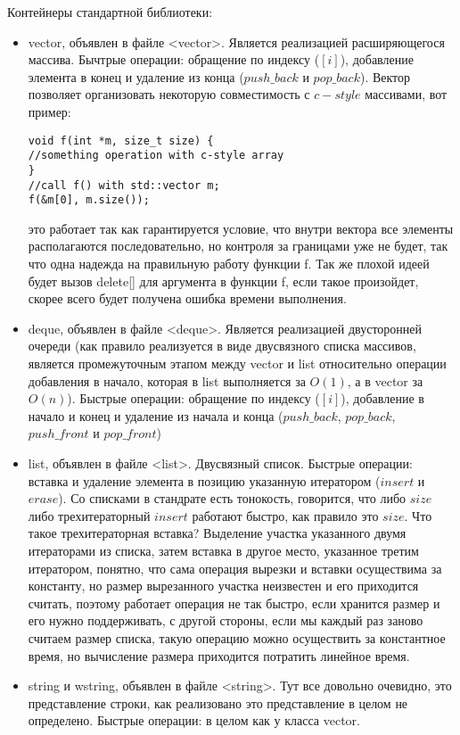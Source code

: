 Контейнеры стандартной библиотеки:

\begin{itemize}
\item vector, объявлен в файле <vector>. Является реализацией расширяющегося массива. Бычтрые операции: обращение по индексу ($[i]$), добавление элемента в конец и
удаление из конца ($push\_back$ и $pop\_back$). Вектор позволяет организовать некоторую совместимость с $c-style$ массивами, вот пример:
\begin{lstlisting}
void f(int *m, size_t size) {
//something operation with c-style array
}
//call f() with std::vector m;
f(&m[0], m.size());
\end{lstlisting}
это работает так как гарантируется условие, что внутри вектора все элементы располагаются последовательно, но контроля за границами уже не будет, так что
одна надежда на правильную работу функции f. Так же плохой идеей будет вызов delete[] для аргумента в функции f, если такое произойдет, скорее всего будет получена
ошибка времени выполнения.

\item deque, объявлен в файле <deque>. Является реализацией двусторонней очереди (как правило реализуется в виде двусвязного списка массивов, является промежуточным
этапом между vector и list относительно операции добавления в начало, которая в list выполняется за $O\left(1\right)$, а в vector за $O\left(n\right)$). Быстрые
операции: обращение по индексу ($[i]$), добавление в начало и конец и удаление из начала и конца ($push\_back$, $pop\_back$, $push\_front$ и $pop\_front$)

\item list, объявлен в файле <list>. Двусвязный список. Быстрые операции: вставка и удаление элемента в позицию указанную итератором ($insert$ и $erase$). Со списками
в стандрате есть тонокость, говорится, что либо $size$ либо трехитераторный $insert$ работают быстро, как правило это $size$. Что такое трехитераторная вставка?
Выделение участка указанного двумя итераторами из списка, затем вставка в другое место, указанное третим итератором, понятно, что сама операция вырезки и вставки
осуществима за константу, но размер вырезанного участка неизвестен и его приходится считать, поэтому работает операция не так быстро, если хранится размер и его
нужно поддерживать, с другой стороны, если мы каждый раз заново считаем размер списка, такую операцию можно осуществить за константное время, но вычисление размера
приходится потратить линейное время.

\item string и wstring, объявлен в файле <string>. Тут все довольно очевидно, это представление строки, как реализовано это представление в целом не определено.
Быстрые операции: в целом как у класса vector.
\end{itemize}

